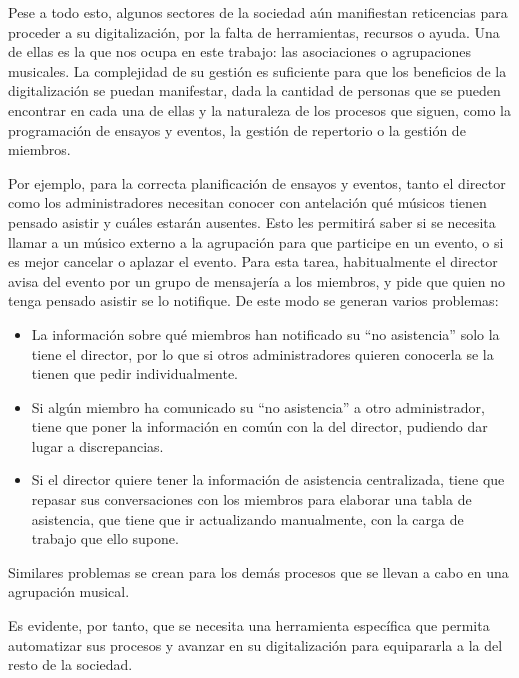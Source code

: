 
Pese a todo esto, algunos sectores de la sociedad aún manifiestan reticencias para proceder a su digitalización, por la falta de herramientas, recursos o ayuda. 
Una de ellas es la que nos ocupa en este trabajo: las asociaciones o agrupaciones musicales. La complejidad de su gestión es suficiente para que los beneficios de la digitalización se puedan manifestar, dada la cantidad de personas que se pueden encontrar en cada una de ellas y la naturaleza de los procesos que siguen, como la programación de ensayos y eventos, la gestión de repertorio o la gestión de miembros.

Por ejemplo, para la correcta planificación de ensayos y eventos, tanto el director como los administradores necesitan conocer con antelación qué músicos tienen pensado asistir y cuáles estarán ausentes. Esto les permitirá saber si se necesita llamar a un músico externo a la agrupación para que participe en un evento, o si es mejor cancelar o aplazar el evento. Para esta tarea, habitualmente el director avisa del evento por un grupo de mensajería a los miembros, y pide que quien no tenga pensado asistir se lo notifique. De este modo se generan varios problemas:

\begin{itemize}
    \item La información sobre qué miembros han notificado su ``no asistencia'' solo la tiene el director, por lo que si otros administradores quieren conocerla se la tienen que pedir individualmente.
    \item Si algún miembro ha comunicado su ``no asistencia'' a otro administrador, tiene que poner la información en común con la del director, pudiendo dar lugar a discrepancias.
    \item Si el director quiere tener la información de asistencia centralizada, tiene que repasar sus conversaciones con los miembros para elaborar una tabla de asistencia, que tiene que ir actualizando manualmente, con la carga de trabajo que ello supone.
\end{itemize}

Similares problemas se crean para los demás procesos que se llevan a cabo en una agrupación musical.

Es evidente, por tanto, que se necesita una herramienta específica que permita automatizar sus procesos y avanzar en su digitalización para equipararla a la del resto de la sociedad.

